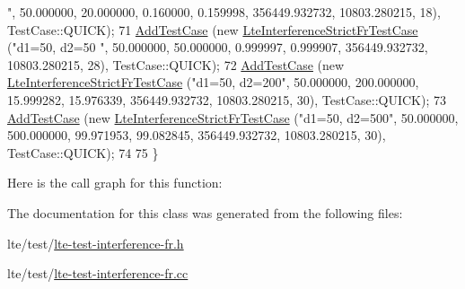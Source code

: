 \begin{DoxyCode}
{      "},  50.000000, 20.000000,  0.160000, 0.159998, 356449.932732, 10803.280215, 18), TestCase::QUICK);
71   \hyperlink{classns3_1_1TestCase_a3718088e3eefd5d6454569d2e0ddd835}{AddTestCase} (\textcolor{keyword}{new} \hyperlink{classLteInterferenceStrictFrTestCase}{LteInterferenceStrictFrTestCase} (\textcolor{stringliteral}{"d1=50, d2=50
      "},  50.000000, 50.000000, 0.999997, 0.999907, 356449.932732, 10803.280215, 28), TestCase::QUICK);
72   \hyperlink{classns3_1_1TestCase_a3718088e3eefd5d6454569d2e0ddd835}{AddTestCase} (\textcolor{keyword}{new} \hyperlink{classLteInterferenceStrictFrTestCase}{LteInterferenceStrictFrTestCase} (\textcolor{stringliteral}{"d1=50,
       d2=200"},  50.000000, 200.000000,  15.999282, 15.976339, 356449.932732, 10803.280215, 30), TestCase::QUICK);
73   \hyperlink{classns3_1_1TestCase_a3718088e3eefd5d6454569d2e0ddd835}{AddTestCase} (\textcolor{keyword}{new} \hyperlink{classLteInterferenceStrictFrTestCase}{LteInterferenceStrictFrTestCase} (\textcolor{stringliteral}{"d1=50,
       d2=500"},  50.000000, 500.000000,  99.971953, 99.082845, 356449.932732, 10803.280215, 30), TestCase::QUICK);
74 
75 \}
\end{DoxyCode}


Here is the call graph for this function\+:




The documentation for this class was generated from the following files\+:\begin{DoxyCompactItemize}
\item 
lte/test/\hyperlink{lte-test-interference-fr_8h}{lte-\/test-\/interference-\/fr.\+h}\item 
lte/test/\hyperlink{lte-test-interference-fr_8cc}{lte-\/test-\/interference-\/fr.\+cc}\end{DoxyCompactItemize}
